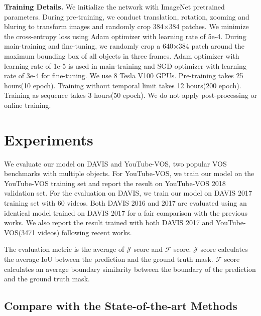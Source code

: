 \documentclass[final]{cvpr}
\begin{document}
\textbf{Training Details. }
We initialize the network with ImageNet pretrained parameters. During pre-training, we conduct translation, rotation, zooming and bluring to transform images and randomly crop 384$\times$384 patches. We minimize the cross-entropy loss using Adam optimizer with learning rate of 5e-4. During main-training and fine-tuning, we randomly crop a 640$\times$384 patch around the maximum bounding box of all objects in three frames. Adam optimizer with learning rate of 1e-5 is used in main-training and SGD optimizer with learning rate of 3e-4 for fine-tuning. We use 8 Tesla V100 GPUs.   Pre-training  takes  25  hours(10  epoch).   Training without temporal limit takes 12 hours(200 epoch). Training as sequence takes 3 hours(50 epoch). We do not apply post-processing or online training. 






\section{Experiments}
We evaluate our model on DAVIS\cite{davis2016,davis2017} and YouTube-VOS\cite{youtubevos}, two popular VOS benchmarks with multiple objects. For YouTube-VOS, we train our model on the YouTube-VOS training set and report the result on YouTube-VOS 2018 validation set. For the evaluation on DAVIS, we train our model on DAVIS 2017 training set with 60 videos. Both DAVIS 2016 and 2017 are evaluated using an identical model trained on DAVIS 2017 for a fair comparison with the previous works. We also report the result trained with both DAVIS 2017 and YouTube-VOS(3471 videos) following recent works. 

The evaluation metric is the average of $\mathcal{J}$ score and $\mathcal{F}$ score. $\mathcal{J}$ score calculates the average IoU between the prediction and the ground truth mask. $\mathcal{F}$ score calculates an average boundary similarity between the boundary of the prediction and the ground truth mask. 


\subsection{Compare with the State-of-the-art Methods}
\end{document}
